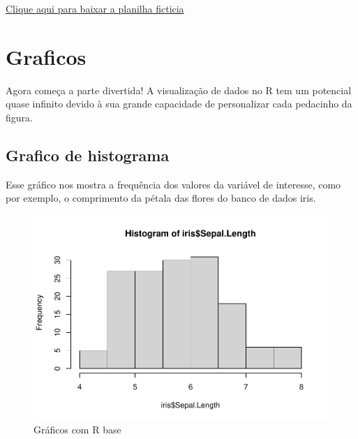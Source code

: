 \documentclass[
]{book}
\newenvironment{Shaded}{\begin{snugshade}}{\end{snugshade}}
\newcommand{\CommentTok}[1]{\textcolor[rgb]{0.56,0.35,0.01}{\textit{#1}}}
\newcommand{\FunctionTok}[1]{\textcolor[rgb]{0.13,0.29,0.53}{\textbf{#1}}}
\newcommand{\NormalTok}[1]{#1}
\newcommand{\SpecialCharTok}[1]{\textcolor[rgb]{0.81,0.36,0.00}{\textbf{#1}}}
\begin{document}
\href{data/fake_data.xlsx}{Clique aqui para baixar a planilha ficticia}

\hypertarget{graficos}{%
\section{Graficos}\label{graficos}}

Agora começa a parte divertida! A visualização de dados no R tem um potencial quase infinito devido à sua grande capacidade de personalizar cada pedacinho da figura.

\hypertarget{grafico-de-histograma}{%
\subsection{Grafico de histograma}\label{grafico-de-histograma}}

Esse gráfico nos mostra a frequência dos valores da variável de interesse, como por exemplo, o comprimento da pétala das flores do banco de dados iris.

\begin{Shaded}
\end{Shaded}

\begin{figure}
\centering
\includegraphics{_main_files/figure-latex/nome-do-chunk1-1.pdf}
\caption{\label{fig:nome-do-chunk1}Gráficos com R base}
\end{figure}
\end{document}
